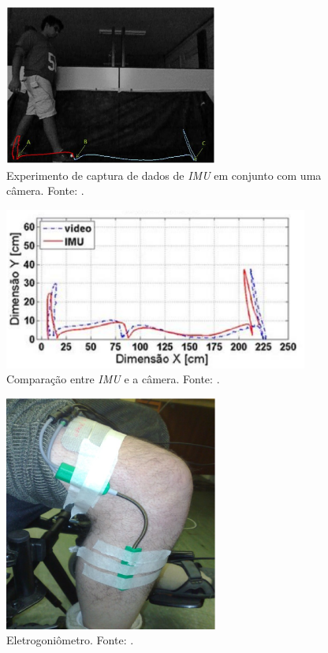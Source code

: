 \begin{figure}[ht]
	\centering
	\includegraphics[width=7cm]{figuras/imu.eps}
	\caption{Experimento de captura de dados de \emph{IMU} em conjunto com uma câmera. Fonte: \cite{Leite2014}.}
	\label{imu}
	
\end{figure}


\begin{figure}[ht]
	\centering
	\includegraphics[width=10cm]{figuras/imu2.eps}
	\caption{Comparação entre \emph{IMU} e a câmera. Fonte: \cite{Leite2014}.}
	\label{imu2}
	
\end{figure}


\begin{figure}[ht]
	\centering
	\includegraphics[width=7cm]{figuras/egn.eps}
	\caption{Eletrogoniômetro. Fonte: \cite{K.Ibrahim2012}.}
	\label{egn}
	
\end{figure}


